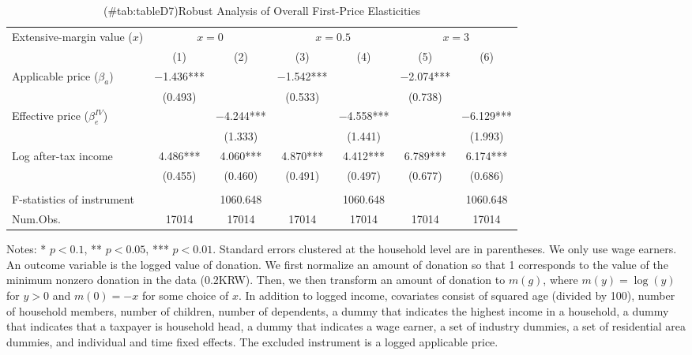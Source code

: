 \begin{table}

\caption{(\#tab:tableD7)Robust Analysis of Overall First-Price Elasticities\label{tab:ext-margin-value}}
\centering
\fontsize{8}{10}\selectfont
\begin{threeparttable}
\begin{tabular}[t]{lcccccc}
\toprule
\multicolumn{1}{c}{Extensive-margin value ($x$)} & \multicolumn{2}{c}{$x = 0$} & \multicolumn{2}{c}{$x = 0.5$} & \multicolumn{2}{c}{$x = 3$} \\
\cmidrule(l{3pt}r{3pt}){1-1} \cmidrule(l{3pt}r{3pt}){2-3} \cmidrule(l{3pt}r{3pt}){4-5} \cmidrule(l{3pt}r{3pt}){6-7}
  & (1) & (2) & (3) & (4) & (5) & (6)\\
\midrule
Applicable price ($\beta_a$) & \num{-1.436}*** &  & \num{-1.542}*** &  & \num{-2.074}*** & \\
 & (\num{0.493}) &  & (\num{0.533}) &  & (\num{0.738}) & \\
Effective price ($\beta^{IV}_e$) &  & \num{-4.244}*** &  & \num{-4.558}*** &  & \num{-6.129}***\\
 &  & (\num{1.333}) &  & (\num{1.441}) &  & (\num{1.993})\\
Log after-tax income & \num{4.486}*** & \num{4.060}*** & \num{4.870}*** & \num{4.412}*** & \num{6.789}*** & \num{6.174}***\\
 & (\num{0.455}) & (\num{0.460}) & (\num{0.491}) & (\num{0.497}) & (\num{0.677}) & (\num{0.686})\\
\midrule
\addlinespace[0.3em]
\multicolumn{7}{l}{\textit{1st stage information (Excluded instrument: Applicable price)}}\\
\hspace{1em}F-statistics of instrument &  & \num{1060.648} &  & \num{1060.648} &  & \num{1060.648}\\
Num.Obs. & \num{17014} & \num{17014} & \num{17014} & \num{17014} & \num{17014} & \num{17014}\\
\bottomrule
\end{tabular}
\begin{tablenotes}
\item Notes: * $p < 0.1$, ** $p < 0.05$, *** $p < 0.01$. Standard errors clustered at the household level are in parentheses. We only use wage earners. An outcome variable is the logged value of donation. We first normalize an amount of donation so that 1 corresponds to the value of the minimum nonzero donation in the data ($0.2$KRW). Then, we then transform an amount of donation to $m(g)$, where $m(y) = \log(y)$ for $y > 0$ and $m(0) = -x$ for some choice of $x$. In addition to logged income, covariates consist of squared age (divided by 100), number of household members, number of children, number of dependents, a dummy that indicates the highest income in a household, a dummy that indicates that a taxpayer is household head, a dummy that indicates a wage earner, a set of industry dummies, a set of residential area dummies, and individual and time fixed effects. The excluded instrument is a logged applicable price.
\end{tablenotes}
\end{threeparttable}
\end{table}
